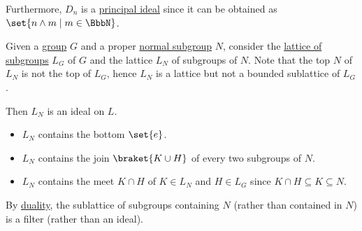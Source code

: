 \begin{example}
\begin{thmenum}
    Furthermore, \( D_n \) is a \hyperref[def:semiring_ideal]{principal ideal} since it can be obtained as \( \set{ n \wedge m \mid m \in \BbbN } \).

     Given a \hyperref[def:group]{group} \( G \) and a proper \hyperref[thm:normal_subgroup_equivalences]{normal subgroup} \( N \), consider the \hyperref[thm:substructures_form_complete_lattice]{lattice of subgroups} \( L_G \) of \( G \) and the lattice \( L_N \) of subgroups of \( N \). Note that the top \( N \) of \( L_N \) is not the top of \( L_G \), hence \( L_N \) is a lattice but not a bounded sublattice of \( L_G \).

    Then \( L_N \) is an ideal on \( L \).
    \begin{itemize}
      \item \( L_N \) contains the bottom \( \set{ e } \).
      \item \( L_N \) contains the join \( \braket{ K \cup H } \) of every two subgroups of \( N \).
      \item \( L_N \) contains the meet \( K \cap H \) of \( K \in L_N \) and \( H \in L_G \) since \( K \cap H \subseteq K \subseteq N \).
    \end{itemize}

    By \hyperref[def:lattice/duality]{duality}, the sublattice of subgroups containing \( N \) (rather than contained in \( N \)) is a filter (rather than an ideal).
  \end{thmenum}
\end{example}

